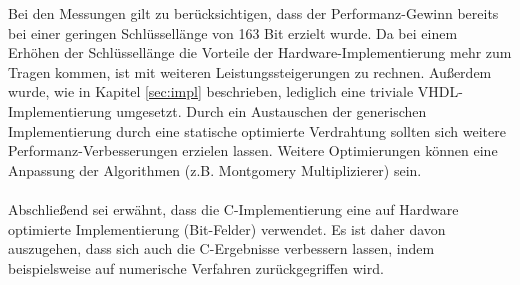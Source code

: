 Bei den Messungen gilt zu berücksichtigen, dass der Performanz-Gewinn bereits bei einer geringen Schlüssellänge von 163 Bit erzielt wurde. Da bei einem Erhöhen der Schlüssellänge die Vorteile der Hardware-Implementierung mehr zum Tragen kommen, ist mit weiteren Leistungssteigerungen zu rechnen. Außerdem wurde, wie in Kapitel \ref{sec:impl} beschrieben, lediglich eine triviale VHDL-Implementierung umgesetzt. Durch ein Austauschen der generischen Implementierung durch eine statische optimierte Verdrahtung sollten sich weitere Performanz-Verbesserungen erzielen lassen. Weitere Optimierungen können eine Anpassung der Algorithmen (z.B. Montgomery Multiplizierer) sein.
\\ \\
Abschließend sei erwähnt, dass die C-Implementierung \cite{kewish} eine auf Hardware optimierte Implementierung (Bit-Felder) verwendet. Es ist daher davon auszugehen, dass sich auch die C-Ergebnisse verbessern lassen, indem beispielsweise auf numerische Verfahren zurückgegriffen wird. \\

